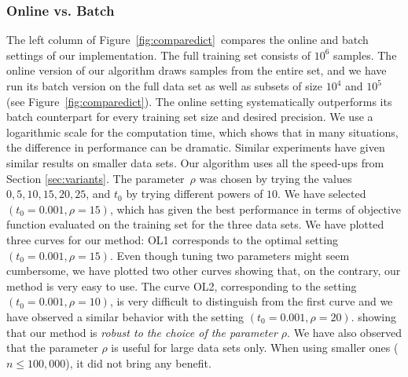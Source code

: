 \documentclass[twoside,11pt]{article}
\begin{document}
\subsubsection{Online vs. Batch} 
The left column of Figure~\ref{fig:comparedict}~compares the online and batch
settings of our implementation. The full training set consists of $10^6$
samples.  The online version of our algorithm draws samples from the entire
set, and we have run its batch version on the full data set as well as subsets
of size $10^4$ and $10^5$ (see Figure~\ref{fig:comparedict}). The online setting systematically
outperforms its batch counterpart for every training set size and desired
precision.  We use a logarithmic scale for the computation time, which shows
that in many situations, the difference in performance can be dramatic. Similar
experiments have given similar results on smaller data sets.
Our algorithm uses all the speed-ups from Section \ref{sec:variants}.
The parameter~$\rho$ was chosen by trying the values $0,5,10,15,20,25$, and
$t_0$ by trying different powers of $10$. We have selected
$(t_0=0.001,\rho=15)$, which has given the best performance in terms of
objective function evaluated on the training set for the three data sets.
We have plotted three curves for our method: \textsf{OL1} corresponds
to the optimal setting $(t_0=0.001,\rho=15)$. 
Even though tuning two parameters might seem cumbersome, we have plotted two
other curves showing that, on the contrary, our method is very easy to use.
The curve \textsf{OL2}, corresponding to the setting
$(t_0=0.001,\rho=10)$, is very difficult to distinguish from the first curve
and we have observed a similar behavior with the setting $(t_0=0.001,\rho=20)$.
showing that our method is \emph{robust to the choice of the parameter $\rho$}.
We have also observed that the parameter $\rho$ is useful for large data sets only.
When using smaller ones ($n \leq 100, 000$), it did not bring any benefit.
\end{document}
